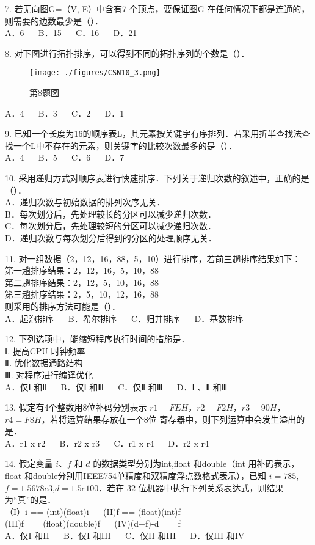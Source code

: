 7. 若无向图G=（V, E）中含有7 个顶点，要保证图G 在任何情况下都是连通的，则需要的边数最少是（）． \\
A．6 $\quad$ B．15 $\quad$ C．16 $\quad$ D．21

8. 对下图进行拓扑排序，可以得到不同的拓扑序列的个数是（）． \\
\begin{figure}[ht]
\centering
\texttt{[image: ./figures/CSN10\_3.png]}
\caption{第8题图} \label{CSN10_fig3}
\end{figure}
A．4 $\quad$ B．3 $\quad$ C．2 $\quad$ D．1

9. 已知一个长度为16的顺序表L，其元素按关键字有序排列．若采用折半查找法查找一个L中不存在的元素，则关键字的比较次数最多的是（）． \\
A．4 $\quad$ B．5 $\quad$ C．6 $\quad$ D．7

10. 采用递归方式对顺序表进行快速排序．下列关于递归次数的叙述中，正确的是（）． \\
A．递归次数与初始数据的排列次序无关． \\
B．每次划分后，先处理较长的分区可以减少递归次数． \\
C．每次划分后，先处理较短的分区可以减少递归次数． \\
D．递归次数与每次划分后得到的分区的处理顺序无关．

11. 对一组数据（2，12，16，88，5，10）进行排序，若前三趟排序结果如下： \\
第一趟排序结果：2，12，16，5，10，88 \\
第二趟排序结果：2，12，5，10，16，88 \\
第三趟排序结果：2，5，10，12，16，88 \\
则采用的排序方法可能是（）． \\
A．起泡排序 $\quad$ B．希尔排序 $\quad$ C．归并排序 $\quad$ D．基数排序

12. 下列选项中，能缩短程序执行时间的措施是． \\
Ⅰ. 提高CPU 时钟频率 \\
Ⅱ. 优化数据通路结构 \\
Ⅲ. 对程序进行编译优化 \\
A．仅Ⅰ 和Ⅱ $\quad$ B．仅Ⅰ 和Ⅲ $\quad$ C．仅Ⅱ 和Ⅲ $\quad$ D．Ⅰ 、Ⅱ 和Ⅲ

13. 假定有4个整数用8位补码分别表示 $r1=FEH$，$r2=F2H$，$r3=90H$，$r4=F8H$，若将运算结果存放在一个8位
寄存器中，则下列运算中会发生溢出的是． \\
A．r1 x r2 $\quad$ B．r2 x r3 $\quad$ C．r1 x r4 $\quad$ D．r2 x r4

14. 假定变量 $i$、$f$ 和 $d$ 的数据类型分别为int,float 和double（int 用补码表示，float 和double分别用IEEE754单精度和双精度浮点数格式表示），已知 $i=785$,$f=1.5678e3$,$d=1.5e100$．若在 $32$ 位机器中执行下列关系表达式，则结果为“真”的是． \\
（I）i == (int)(float)i $\quad$ (II)f == (float)(int)f \\
(III)f == (float)(double)f $\quad$ (IV)(d+f)-d == f \\
A．仅I 和II $\quad$ B．仅I 和III $\quad$ C．仅II 和III $\quad$ D．仅III 和IV

